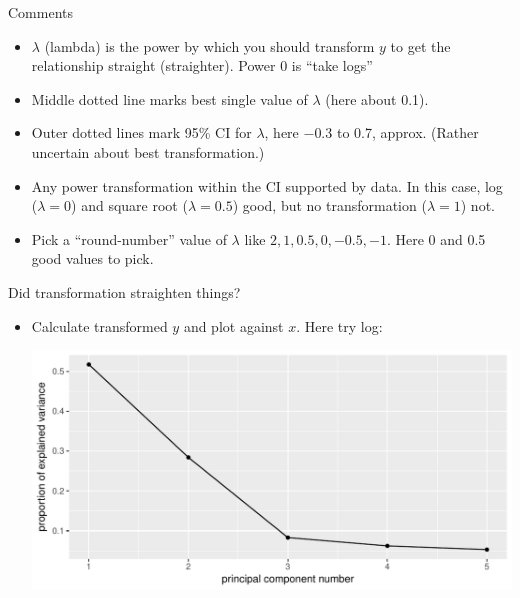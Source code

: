 \begin{frame}[fragile]{Comments}
  \begin{itemize}
  \item $\lambda$ (lambda) is the power by which you should transform
    $y$ to get the relationship straight (straighter). Power 0 is
    ``take logs''
  \item Middle dotted line marks best single value of $\lambda$ (here
    about 0.1).
  \item Outer dotted lines mark 95\% CI for $\lambda$, here $-0.3$ to
    0.7, approx. (Rather uncertain about best transformation.)
  \item Any power transformation within the CI supported by data. In
    this case, log ($\lambda=0$) and square root ($\lambda=0.5$) good,
    but no transformation ($\lambda=1$)  not.
  \item Pick a ``round-number'' value of $\lambda$ like
    $2,1,0.5,0,-0.5,-1$. Here 0 and 0.5 good values to pick. 
  \end{itemize}
\end{frame}

\begin{frame}[fragile]{Did transformation straighten things?}
  
  \begin{itemize}
  \item Calculate transformed $y$ and plot against $x$. Here try log:
 
 
\begin{knitrout}
\color{fgcolor}\begin{kframe}
\begin{alltt}
\hlkwb{=}\hlopt{$}
\hlstd{(}\hlopt{+}\hlstd{()}\hlopt{+}
  \hlstd{()}
\end{alltt}


{\ttfamily\noindent\itshape\color{messagecolor}{`geom\_smooth()` using method = 'loess'}}\end{kframe}
\includegraphics[width=\maxwidth]{figure/unnamed-chunk-17-1} 

\end{knitrout}

    
  \end{itemize}
  
\end{frame}

